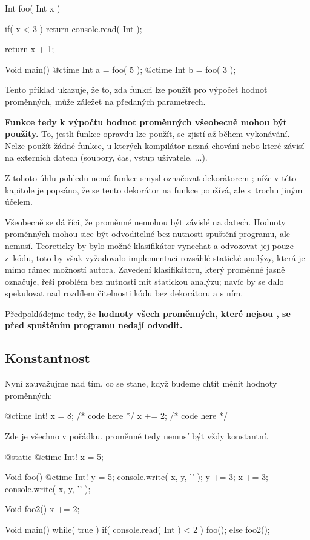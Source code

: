 \begin{code}
Int foo( Int x ) {
	if( x < 3 )
		return console.read( Int );

	return x + 1;
}

Void main() {
	@ctime Int a = foo( 5 );
	@ctime Int b = foo( 3 );
}
\end{code}

Tento příklad ukazuje, že to, zda funkci lze použít pro výpočet hodnot \ctime proměnných, může záležet na předaných parametrech.

\textbf{Funkce tedy k výpočtu hodnot \ctime proměnných všeobecně mohou být použity.} To, jestli funkce opravdu lze použít, se zjistí až během vykonávání. Nelze použít žádné funkce, u kterých kompilátor nezná chování nebo které závisí na externích datech (soubory, čas, vstup uživatele, ...).

Z tohoto úhlu pohledu nemá funkce smysl označovat dekorátorem ; níže v této kapitole je popsáno, že se tento dekorátor na funkce používá, ale s~trochu jiným účelem.

Všeobecně se dá říci, že \ctime proměnné nemohou být závislé na \nonctime datech. Hodnoty \nonctime proměnných mohou sice být odvoditelné bez nutnosti spuštění programu, ale nemusí. Teoreticky by bylo možné klasifikátor vynechat a odvozovat jej pouze z~kódu, toto by však vyžadovalo implementaci rozsáhlé statické analýzy, která je mimo rámec možností autora. Zavedení klasifikátoru, který \ctime proměnné jasně označuje, řeší problém bez nutnosti mít statickou analýzu; navíc by se dalo spekulovat nad rozdílem čitelnosti kódu bez \ctime dekorátoru a s ním.

Předpokládejme tedy, že \textbf{hodnoty všech proměnných, které nejsou \ctime, se před spuštěním programu nedají odvodit.}

\subsection{Konstantnost}
Nyní zauvažujme nad tím, co se stane, když budeme chtít měnit hodnoty \ctime proměnných:

\begin{code}
@ctime Int! x = 8;
/* code here */
x += 2;
/* code here */
\end{code}

Zde je všechno v pořádku. \ctime proměnné tedy nemusí být vždy konstantní.

\begin{code}
@static @ctime Int! x = 5;

Void foo() {
	@ctime Int! y = 5;
	console.write( x, y, '\n' );
	y += 3;
	x += 3;
	console.write( x, y, '\n' );
}

Void foo2() {
	x += 2;
}

Void main() {
	while( true ) {
		if( console.read( Int ) < 2 )
			foo();
		else
			foo2();
	}
}
\end{code}

